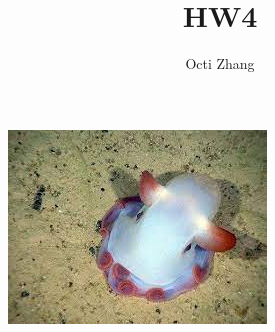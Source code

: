 \documentclass{article}
\title{HW4}
\author{Octi Zhang}
\begin{document}
\maketitle
\renewcommand{\abstractname}{OCTIPUS}
\begin{abstract}
\end{abstract}
\begin{figure}[!h]
    \centering\includegraphics[width=0.4\linewidth]{octipus.jpeg}
\end{figure}






\end{document}
